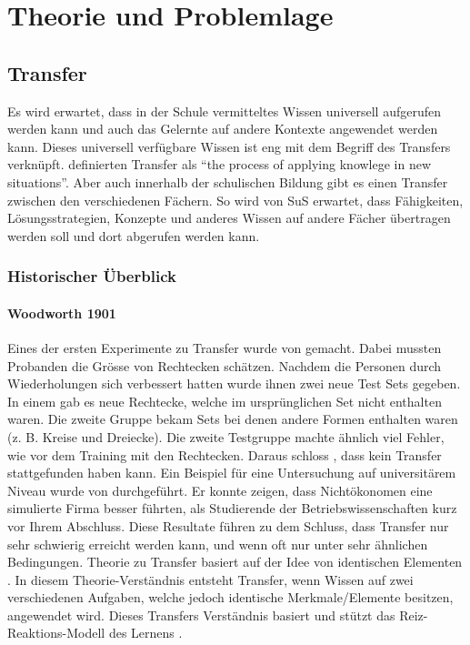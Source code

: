 \chapter{Theorie und Problemlage}

\section{Transfer}

Es wird erwartet, dass in der Schule vermitteltes Wissen universell aufgerufen werden kann und auch das Gelernte auf andere Kontexte angewendet werden kann. Dieses universell verfügbare Wissen ist eng mit dem Begriff des Transfers verknüpft. \citet{Greeno1996} definierten Transfer als "`the process of applying knowlege in new situations"'. Aber auch innerhalb der schulischen Bildung gibt es einen Transfer zwischen den verschiedenen Fächern. So wird von SuS erwartet, dass Fähigkeiten, Lösungsstrategien, Konzepte und anderes Wissen auf andere Fächer übertragen werden soll und dort abgerufen werden kann.

\subsection{Historischer Überblick}


\subsubsection{Woodworth 1901}

Eines der ersten Experimente zu Transfer wurde von \citet{Woodworth1901} gemacht. Dabei mussten Probanden die Grösse von Rechtecken schätzen. Nachdem die Personen durch Wiederholungen sich verbessert hatten wurde ihnen zwei neue Test Sets gegeben. In einem gab es neue Rechtecke, welche im ursprünglichen Set nicht enthalten waren. Die zweite Gruppe bekam Sets bei denen andere Formen enthalten waren (z. B. Kreise und Dreiecke). Die zweite Testgruppe machte ähnlich viel Fehler, wie vor dem Training mit den Rechtecken. Daraus schloss \citeauthor{Woodworth1901}, dass kein Transfer stattgefunden haben kann.
Ein Beispiel für eine Untersuchung auf universitärem Niveau wurde von \citet{Renkl1994} durchgeführt. Er konnte zeigen, dass Nichtökonomen eine simulierte Firma besser führten, als Studierende der Betriebswissenschaften kurz vor Ihrem Abschluss. Diese Resultate führen zu dem Schluss, dass Transfer nur sehr schwierig erreicht werden kann, und wenn oft nur unter sehr ähnlichen Bedingungen. \citeauthor{Woodworth1901} Theorie zu Transfer basiert auf der Idee von identischen Elementen \citep{Pea2013b}. In diesem Theorie-Verständnis entsteht Transfer, wenn Wissen auf zwei verschiedenen Aufgaben, welche jedoch identische Merkmale/Elemente besitzen, angewendet wird. Dieses Transfers Verständnis basiert und stützt das Reiz-Reaktions-Modell des Lernens \citep{Detterman1993, Mietzel2007}.
